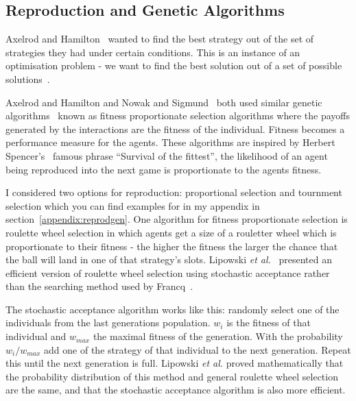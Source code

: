 \documentclass[]{final_report}
\begin{document}
\subsection{Reproduction and Genetic Algorithms}
\label{subs:backgroundreproduction}
Axelrod and Hamilton~\cite{evolution_of_cooperation} wanted to find the best strategy out of the set of strategies they had under certain conditions. This is an instance of an optimisation problem - we want to find the best solution out of a set of possible solutions~\cite{optimisation_problems}.\par 
Axelrod and Hamilton and Nowak and Sigmund~\cite{evol_indirect_image} both used similar genetic algorithms~\cite{mitchell1998introduction} known as fitness proportionate selection algorithms where the payoffs generated by the interactions are the fitness of the individual. Fitness becomes a performance measure for the agents. These algorithms are inspired by Herbert Spencer's~\cite{spencer1864principles} famous phrase ``Survival of the fittest'', the likelihood of an agent being reproduced into the next game is proportionate to the agents fitness.\par 
I considered two options for reproduction: proportional selection and tournment selection which you can find examples for in my appendix in section~\ref{appendix:reprodgen}. One algorithm for fitness proportionate selection is roulette wheel selection in which agents get a size of a rouletter wheel which is proportionate to their fitness - the higher the fitness the larger the chance that the ball will land in one of that strategy's slots. Lipowski \textit{et al.}~\cite{lipowski2012roulette} presented an efficient version of roulette wheel selection using stochastic acceptance rather than the searching method used by Francq~\cite{genetic_algorithms}.\par 
The stochastic acceptance algorithm works like this: randomly select one of the individuals from the last generations population. $w_i$ is the fitness of that individual and $w_{max}$ the maximal fitness of the generation. With the probability $w_i / w_{max}$ add one of the strategy of that individual to the next generation. Repeat this until the next generation is full. Lipowski \textit{et al.} proved mathematically that the probability distribution of this method and general roulette wheel selection are the same, and that the stochastic acceptance algorithm is also more efficient.
\end{document}
